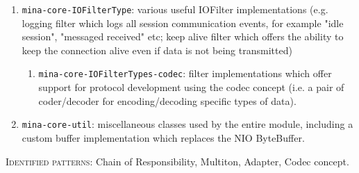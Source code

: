 \begin{enumerate}
\begin{enumerate}
        \end{enumerate}
    \item \texttt{mina-core-IOFilterType}: various useful IOFilter implementations (e.g. logging filter which logs all session communication events, for example "idle session", "messaged received" etc; keep alive filter which offers the ability to keep the connection alive even if data is not being transmitted)
        \begin{enumerate}
            \item \texttt{mina-core-IOFilterTypes-codec}: filter implementations which offer support for protocol development using the codec concept (i.e. a pair of coder/decoder for encoding/decoding specific types of data). 
        \end{enumerate}
    \item \texttt{mina-core-util}: miscellaneous classes used by the entire module, including a custom buffer implementation which replaces the NIO ByteBuffer.
\end{enumerate}
\textsc{Identified patterns}: Chain of Responsibility, Multiton, Adapter, Codec concept.

